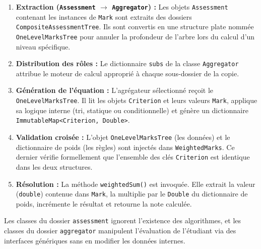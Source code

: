\documentclass[11pt, a4paper]{article}
\begin{document}
\begin{enumerate}
    \item \textbf{Extraction (\texttt{Assessment} $\rightarrow$ \texttt{Aggregator}) :} Les objets \texttt{Assessment} contenant les instances de \texttt{Mark} sont extraits des dossiers \texttt{CompositeAssessmentTree}. Ils sont convertis en une structure plate nommée \texttt{OneLevelMarksTree} pour annuler la profondeur de l'arbre lors du calcul d'un niveau spécifique.
    \item \textbf{Distribution des rôles :} Le dictionnaire \texttt{subs} de la classe \texttt{Aggregator} attribue le moteur de calcul approprié à chaque sous-dossier de la copie.
    \item \textbf{Génération de l'équation :} L'agrégateur sélectionné reçoit le \texttt{OneLevelMarksTree}. Il lit les objets \texttt{Criterion} et leurs valeurs \texttt{Mark}, applique sa logique interne (tri, statique ou conditionnelle) et génère un dictionnaire \texttt{ImmutableMap<Criterion, Double>}.
    \item \textbf{Validation croisée :} L'objet \texttt{OneLevelMarksTree} (les données) et le dictionnaire de poids (les règles) sont injectés dans \texttt{WeightedMarks}. Ce dernier vérifie formellement que l'ensemble des clés \texttt{Criterion} est identique dans les deux structures.
    \item \textbf{Résolution :} La méthode \texttt{weightedSum()} est invoquée. Elle extrait la valeur (\texttt{double}) contenue dans \texttt{Mark}, la multiplie par le \texttt{Double} du dictionnaire de poids, incrémente le résultat et retourne la note calculée.
\end{enumerate}

Les classes du dossier \texttt{assessment} ignorent l'existence des algorithmes, et les classes du dossier \texttt{aggregator} manipulent l'évaluation de l'étudiant via des interfaces génériques sans en modifier les données internes.
\end{document}
